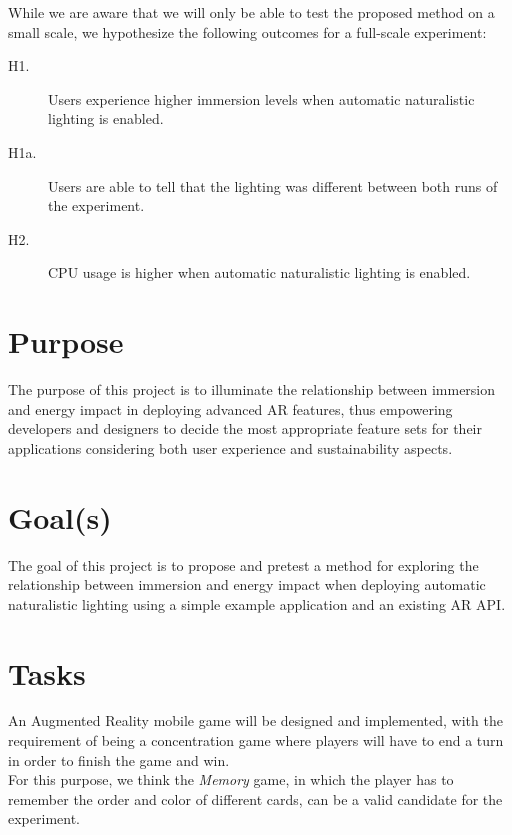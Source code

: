 \documentclass[12pt,twoside,english]{article}
\begin{document}
While we are aware that we will only be able to test the proposed method on a small scale, we hypothesize the following outcomes for a full-scale experiment:

\begin{description}
    \item[H1.] Users experience higher immersion levels when automatic naturalistic lighting is enabled.
    \item[H1a.] Users are able to tell that the lighting was different between both runs of the experiment.
    \item[H2.] \gls{CPU} usage is higher when automatic naturalistic lighting is enabled.
\end{description}



\section{Purpose}
\label{sect:purpose}

The purpose of this project is to illuminate the relationship between immersion and energy impact in deploying advanced \gls{AR} features, thus empowering developers and designers to decide the most appropriate feature sets for their applications considering both user experience and sustainability aspects.

\section{Goal(s)}
\label{sect:goals}

The goal of this project is to propose and pretest a method for exploring the relationship between immersion and energy impact when deploying automatic naturalistic lighting using a simple example application and an existing \gls{AR} \gls{API}.

\section{Tasks}
\label{sect:tasks}

An Augmented Reality mobile game will be designed and implemented, with the requirement of being a concentration game where players will have to end a turn in order to finish the game and win. \\For this purpose, we think the \textit{Memory} game, in which the player has to remember the order and color of different cards, can be a valid candidate for the experiment.
\end{document}
